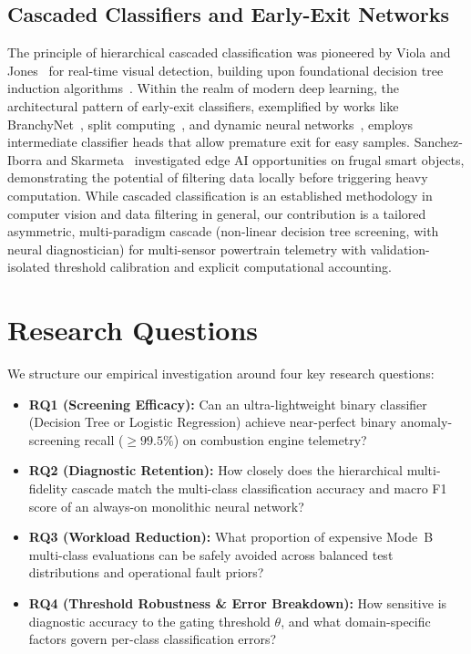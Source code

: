 \documentclass[journal]{IEEEtran}
\begin{document}
\subsection{Cascaded Classifiers and Early-Exit Networks}
The principle of hierarchical cascaded classification was pioneered by Viola and Jones~\cite{viola2004robust} for real-time visual detection, building upon foundational decision tree induction algorithms~\cite{quinlan1986induction}. Within the realm of modern deep learning, the architectural pattern of early-exit classifiers, exemplified by works like BranchyNet~\cite{teerapittayanon2016branchynet}, split computing~\cite{matsubara2022split}, and dynamic neural networks~\cite{han2021dynamic}, employs intermediate classifier heads that allow premature exit for easy samples. Sanchez-Iborra and Skarmeta~\cite{sanchez2020tinyml} investigated edge AI opportunities on frugal smart objects, demonstrating the potential of filtering data locally before triggering heavy computation. While cascaded classification is an established methodology in computer vision and data filtering in general, our contribution is a tailored asymmetric, multi-paradigm cascade (non-linear decision tree screening, with neural diagnostician) for multi-sensor powertrain telemetry with validation-isolated threshold calibration and explicit computational accounting.

\section{Research Questions}
We structure our empirical investigation around four key research questions:
\begin{itemize}
    \item \textbf{RQ1 (Screening Efficacy):} Can an ultra-lightweight binary classifier (Decision Tree or Logistic Regression) achieve near-perfect binary anomaly-screening recall ($\ge 99.5\%$) on combustion engine telemetry?
    \item \textbf{RQ2 (Diagnostic Retention):} How closely does the hierarchical multi-fidelity cascade match the multi-class classification accuracy and macro F1 score of an always-on monolithic neural network?
    \item \textbf{RQ3 (Workload Reduction):} What proportion of expensive Mode~B multi-class evaluations can be safely avoided across balanced test distributions and operational fault priors?
    \item \textbf{RQ4 (Threshold Robustness \& Error Breakdown):} How sensitive is diagnostic accuracy to the gating threshold $\theta$, and what domain-specific factors govern per-class classification errors?
\end{itemize}
\end{document}
